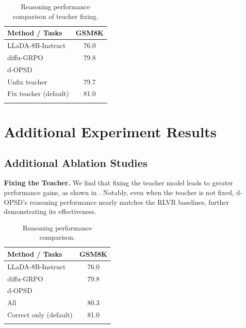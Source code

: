 \documentclass{article}
\begin{document}
\begin{table}
\vspace{-65pt}
\setlength{\tabcolsep}{4pt}
\centering
\caption{Reasoning performance comparison of teacher fixing.}
\begin{tabular}{lc}
\toprule
\textbf{Method / Tasks} & \textbf{GSM8K} \\
\midrule
LLaDA-8B-Instruct & 76.0 \\
diffu-GRPO & 79.8 \\
d-OPSD \\
\quad Unfix teacher & 79.7 \\
\quad Fix teacher (default) & \cellcolor{lightblue} 81.0 \\
\bottomrule
\label{app_tab1}
\end{tabular}
\vspace{-30pt}
\end{table}

\section{Additional Experiment Results} \label{app5}

\subsection{Additional Ablation Studies} \label{app5.1}


\textbf{Fixing the Teacher. } We find that fixing the teacher model leads to greater performance gains, as shown in . Notably, even when the teacher is not fixed, d-OPSD's reasoning performance nearly matches the RLVR baselines, further demonstrating its effectiveness.

\newpage

\begin{table}
\vspace{-7pt}
\setlength{\tabcolsep}{4pt}
\centering
\caption{Reasoning performance comparison.}
\begin{tabular}{lc}
\toprule
\textbf{Method / Tasks} & \textbf{GSM8K} \\
\midrule
LLaDA-8B-Instruct & 76.0 \\
diffu-GRPO & 79.8 \\
d-OPSD \\
\quad All & 80.3 \\
\quad Correct only (default) & \cellcolor{lightblue} 81.0 \\
\bottomrule
\label{app_tab2}
\end{tabular}
\vspace{-50pt}
\end{table}
\end{document}
